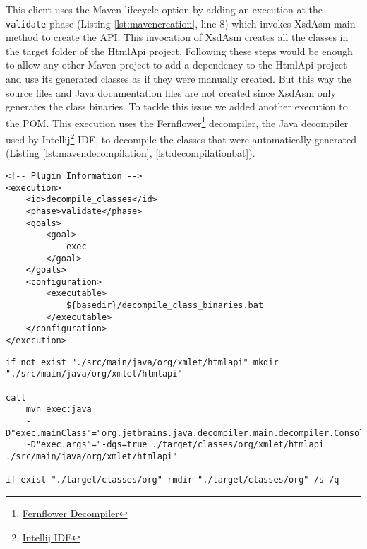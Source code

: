 \noindent
This client uses the Maven lifecycle option by adding an execution at the \texttt{validate} phase (Listing \ref{lst:mavencreation}, line 8) which invokes XsdAsm main method to create the \ac{API}. This invocation of XsdAsm creates all the classes in the target folder of the HtmlApi project. Following these steps would be enough to allow any other Maven project to add a dependency to the HtmlApi project and use its generated classes as if they were manually created. But this way the source files and Java documentation files are not created since XsdAsm only generates the class binaries. To tackle this issue we added another execution to the \ac{POM}. This execution uses the Fernflower\footnote{\href{https://mvnrepository.com/artifact/org.jboss.windup.decompiler/decompiler-fernflower/4.0.0.Final}{Fernflower Decompiler}} decompiler, the Java decompiler used by Intellij\footnote{\href{https://www.jetbrains.com/idea/}{Intellij IDE}} \ac{IDE}, to decompile the classes that were automatically generated (Listing \ref{lst:mavendecompilation}, \ref{lst:decompilationbat}). 

\bigskip


\begin{minipage}{\linewidth}
\begin{lstlisting}[caption={Maven API decompile classes plugin},label={lst:mavendecompilation}]
<!-- Plugin Information -->
<execution>
    <id>decompile_classes</id>
    <phase>validate</phase>
    <goals>
        <goal>
            exec
        </goal>
    </goals>
    <configuration>
        <executable>
            ${basedir}/decompile_class_binaries.bat
        </executable>
    </configuration>
</execution>
\end{lstlisting}
\end{minipage}


\begin{minipage}{\linewidth}
\begin{lstlisting}[caption={Maven API decompile batch file (decompile\_class\_binaries.bat)},label={lst:decompilationbat}]
if not exist "./src/main/java/org/xmlet/htmlapi" mkdir "./src/main/java/org/xmlet/htmlapi"

call 
    mvn exec:java 
    -D"exec.mainClass"="org.jetbrains.java.decompiler.main.decompiler.ConsoleDecompiler" 
    -D"exec.args"="-dgs=true ./target/classes/org/xmlet/htmlapi ./src/main/java/org/xmlet/htmlapi"

if exist "./target/classes/org" rmdir "./target/classes/org" /s /q
\end{lstlisting}
\end{minipage}

